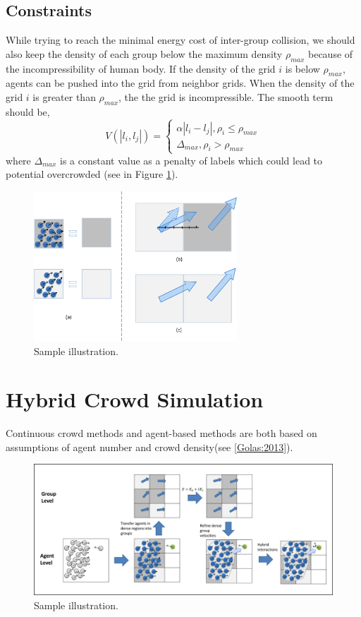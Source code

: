 \subsection{Constraints}
\label{section:3.3}
While trying to reach the minimal energy cost of inter-group collision, we should also keep the density of each group below the maximum density $\rho_{max}$ because of the incompressibility of human body. If the density of the grid $i$ is below $\rho_{max}$, agents can be pushed into the grid from neighbor grids. When the density of the grid $i$ is greater than $\rho_{max}$, the the grid is incompressible. The smooth term should be,
\begin{equation}
\label{eq:9}
V(\left|l_i,l_j\right|) = \left\{ 
{\begin{array}
{*{20}{c}}
{\alpha \left| {{l_i} - {l_j}} \right|,  {\rho _i} \le {\rho _{max}}}\\
{\Delta _{max},  {\rho _i} > {\rho _{max}}}
\end{array}} 
\right.
\end{equation}
where $\Delta_{max}$ is a constant value as a penalty of labels which could lead to potential overcrowded (see in Figure \ref{figure:grid_constraints}).

\begin{figure}
\label{figure:grid_constraints}
  \centering
  \includegraphics[width=3in]{images/fig_inter_grid_constraints}
  \caption{Sample illustration.}
\end{figure}

\section{Hybrid Crowd Simulation}
Continuous crowd methods and agent-based methods are both based on assumptions of agent number and crowd density(see \ref{Golas:2013}).
\begin{figure}
  \centering
  \includegraphics[width=6.4in]{images/pipeline}
  \caption{Sample illustration.}
\end{figure}

